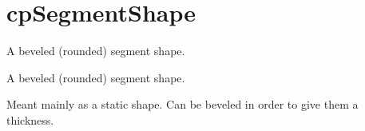 \hypertarget{group__cp_segment_shape}{}\section{cp\+Segment\+Shape}
\label{group__cp_segment_shape}


A beveled (rounded) segment shape.  


A beveled (rounded) segment shape. 

Meant mainly as a static shape. Can be beveled in order to give them a thickness. 